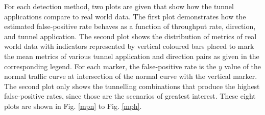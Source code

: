 \documentclass{llncs}
\begin{document}
For each detection method, two plots are given that show how the tunnel
applications compare to real world data. The first plot demonstrates how the estimated
false-positive rate behaves as a function of throughput rate, direction, and
tunnel application. The second plot shows the distribution of metrics of real
world data with indicators represented by vertical coloured bars placed to mark
the mean metrics of various tunnel application and direction pairs as given in
the corresponding legend. For each marker, the false-positive rate is the $y$
value of the normal traffic curve at intersection of the normal curve with the
vertical marker. The second plot only shows the tunnelling combinations that
produce the highest false-positive rates, since those are the scenarios of
greatest interest. These eight plots are shown in Fig. \ref{mpn} to Fig. \ref{mph}.

%
\end{document}
